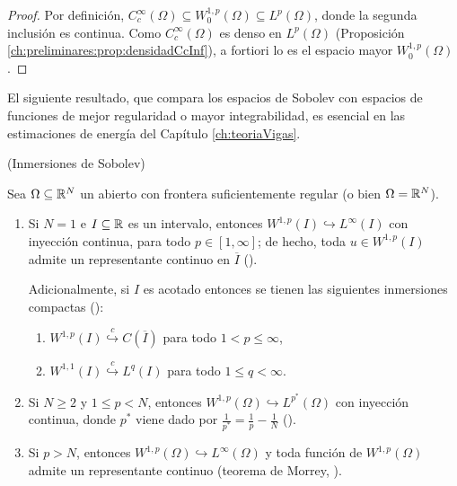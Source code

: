 \begin{proof}
Por definición, $C_c^\infty(\Omega) \subseteq W_0^{1,p}(\Omega) \subseteq L^p(\Omega)$,
donde la segunda inclusión es continua. Como $C_c^\infty(\Omega)$ es denso en
$L^p(\Omega)$ (Proposición \ref{ch:preliminares:prop:densidadCcInf}), a fortiori
lo es el espacio mayor $W_0^{1,p}(\Omega)$.
\end{proof}

El siguiente resultado, que compara los espacios de Sobolev con espacios de
funciones de mejor regularidad o mayor integrabilidad, es esencial en las
estimaciones de energía del Capítulo \ref{ch:teoriaVigas}.\\

\begin{Teorema}{(Inmersiones de Sobolev)}
\label{ch:preliminares:th:inmersionesSobolev}

Sea $\Omega \subseteq \mathbb{R}^N$ un abierto con frontera suficientemente regular
(o bien $\Omega = \mathbb{R}^N$).

\begin{enumerate}
    \item Si $N = 1$ e $I \subseteq \mathbb{R}$ es un intervalo, entonces
    $W^{1,p}(I) \hookrightarrow L^\infty(I)$ con inyección continua, para todo
    $p \in [1, \infty]$; de hecho, toda $u \in W^{1,p}(I)$ admite un representante
    continuo en $\overline{I}$ (\cite[Teorema~8.8]{brezis-2011-fun-ana-sob}).

    Adicionalmente, si $I$ es acotado entonces se tienen las siguientes inmersiones compactas (\cite[Teorema~8.8]{brezis-2011-fun-ana-sob}):
    \begin{enumerate}
        \item $W^{1,p}(I) \overset{c}{\hookrightarrow} C(\overline{I})$ para todo $1 < p \leq \infty$,
        \item $W^{1,1}(I) \overset{c}{\hookrightarrow} L^q(I)$ para todo $1 \leq q < \infty$.
    \end{enumerate}

    \item Si $N \geq 2$ y $1 \leq p < N$, entonces
    $W^{1,p}(\Omega) \hookrightarrow L^{p^*}(\Omega)$ con inyección continua,
    donde $p^*$ viene dado por $\tfrac{1}{p^*} = \tfrac{1}{p} - \tfrac{1}{N}$
    (\cite[Teorema~9.9]{brezis-2011-fun-ana-sob}).

    \item Si $p > N$, entonces $W^{1,p}(\Omega) \hookrightarrow L^\infty(\Omega)$
    y toda función de $W^{1,p}(\Omega)$ admite un representante continuo (teorema
    de Morrey, \cite[Teorema~9.12]{brezis-2011-fun-ana-sob}).
\end{enumerate}
\end{Teorema}

